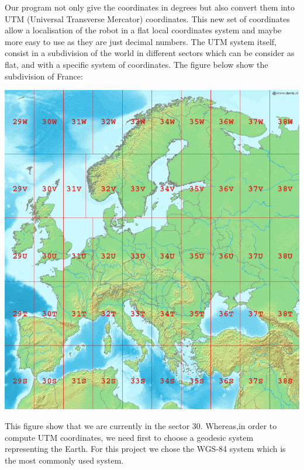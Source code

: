 Our program not only give the coordinates in degrees but also convert them into UTM (Universal Transverse Mercator) coordinates. This new set of coordinates allow a localisation of the robot in a flat local coordinates system and maybe more easy to use as they are just decimal numbers. The UTM system itself, consist in a subdivision of the world in different sectors which can be consider as flat, and with a specific system of coordinates.
The figure below show the subdivision of France: \

\begin{center}
\includegraphics[scale=0.2]{secteurUTM.png} 
\label{fig1}
\end{center}

This figure show that we are currently in the sector 30. Whereas,in order to compute UTM coordinates, we need first to choose a geodesic system representing the Earth. For this project we chose the WGS-84 system which is the most commonly used system.